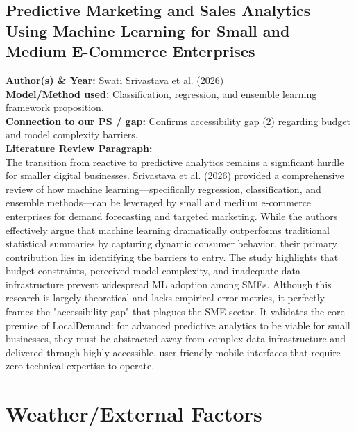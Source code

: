 \documentclass[conference]{IEEEtran}
\begin{document}
\subsection{Predictive Marketing and Sales Analytics Using Machine Learning for Small and Medium E-Commerce Enterprises}
\textbf{Author(s) \& Year:} Swati Srivastava et al. (2026)\\
\textbf{Model/Method used:} Classification, regression, and ensemble learning framework proposition.\\
\textbf{Connection to our PS / gap:} Confirms accessibility gap (2) regarding budget and model complexity barriers.\\
\textbf{Literature Review Paragraph:}\\
The transition from reactive to predictive analytics remains a significant hurdle for smaller digital businesses. Srivastava et al. (2026) provided a comprehensive review of how machine learning---specifically regression, classification, and ensemble methods---can be leveraged by small and medium e-commerce enterprises for demand forecasting and targeted marketing. While the authors effectively argue that machine learning dramatically outperforms traditional statistical summaries by capturing dynamic consumer behavior, their primary contribution lies in identifying the barriers to entry. The study highlights that budget constraints, perceived model complexity, and inadequate data infrastructure prevent widespread ML adoption among SMEs. Although this research is largely theoretical and lacks empirical error metrics, it perfectly frames the "accessibility gap" that plagues the SME sector. It validates the core premise of LocalDemand: for advanced predictive analytics to be viable for small businesses, they must be abstracted away from complex data infrastructure and delivered through highly accessible, user-friendly mobile interfaces that require zero technical expertise to operate.

\section{Weather/External Factors}
\end{document}
